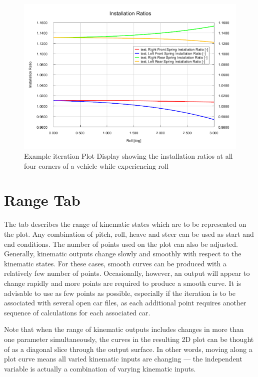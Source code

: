 \begin{figure}
  \includegraphics[width=\textwidth]{images/iteration}
  \caption{Example iteration Plot Display showing the installation ratios at all four corners of a vehicle while experiencing roll} \label{fig:iteration}
  \centering
\end{figure}

\section{Range Tab} \label{sec:rangeTab}

The  tab describes the range of kinematic states which are to be represented on the plot.  Any combination of pitch, roll, heave and steer can be used as start and end conditions.  The number of points used on the plot can also be adjusted.  Generally, kinematic outputs change slowly and smoothly with respect to the kinematic states.  For these cases, smooth curves can be produced with a relatively few number of points.  Occasionally, however, an output will appear to change rapidly and more points are required to produce a smooth curve.  It is advisable to use as few points as possible, especially if the iteration is to be associated with several open car files, as each additional point requires another sequence of calculations for each associated car.

Note that when the range of kinematic outputs includes changes in more than one parameter simultaneously, the curves in the resulting 2D plot can be thought of as a diagonal slice through the output surface.  In other words, moving along a plot curve means all varied kinematic inputs are changing --- the independent variable is actually a combination of varying kinematic inputs.

